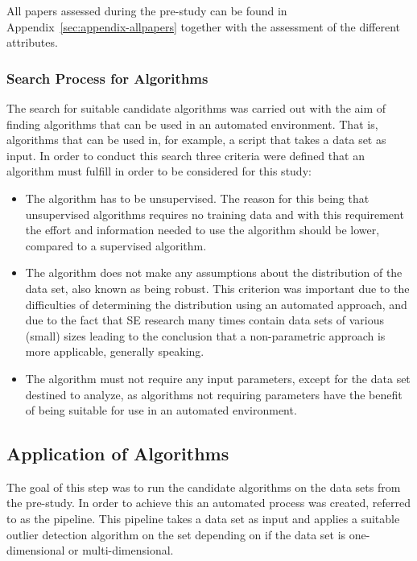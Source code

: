 All papers assessed during the pre-study can be found in Appendix~\ref{sec:appendix-allpapers} together with the assessment of the different attributes.


\subsubsection{Search Process for Algorithms}
\label{sec:method-algorithms}




The search for suitable candidate algorithms was carried out with the aim of finding algorithms that can be used in an automated environment. That is, algorithms that can be used in, for example, a script that takes a data set as input. In order to conduct this search three criteria were defined that an algorithm must fulfill in order to be considered for this study:


\begin{itemize}
\item The algorithm has to be unsupervised. The reason for this being that unsupervised algorithms requires no training data and with this requirement the effort and information needed to use the algorithm should be lower, compared to a supervised algorithm. 




\item The algorithm does not make any assumptions about the distribution of the data set, also known as being robust. This criterion was important due to the difficulties of determining the distribution using an automated approach, and due to the fact that SE research many times contain data sets of various (small) sizes leading to the conclusion that a non-parametric approach is more applicable, generally speaking.




\item The algorithm must not require any input parameters, except for the data set destined to analyze, as algorithms not requiring parameters have the benefit of being suitable for use in an automated environment.
\end{itemize}


\subsection{Application of Algorithms}
\label{sec:method-appalgo}
The goal of this step was to run the candidate algorithms on the data sets from the pre-study. In order to achieve this an automated process was created, referred to as the pipeline. This pipeline takes a data set as input and applies a suitable outlier detection algorithm on the set depending on if the data set is one-dimensional or multi-dimensional. 




